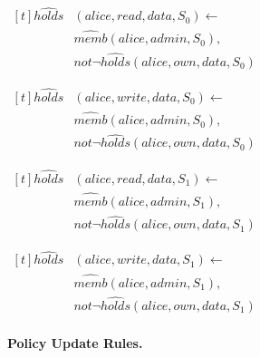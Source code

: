 \documentclass[global,twocolumn,final]{svjour}
\newenvironment{vquote}
  {\begin{list}{}{\leftmargin 1em}\item[]}
  {\end{list}}
\begin{document}
          \begin{vquote}
            \begin{math}
              \begin{aligned}[t]
                \hat{holds}&(alice, read, data, S_{0}) \leftarrow \\
                 & \hat{memb}(alice, admin, S_{0}), \\
                 & not \lnot \hat{holds}(alice, own, data, S_{0})
              \end{aligned}
            \end{math}

            \begin{math}
              \begin{aligned}[t]
                \hat{holds}&(alice, write, data, S_{0}) \leftarrow \\
                 & \hat{memb}(alice, admin, S_{0}), \\
                 & not \lnot \hat{holds}(alice, own, data, S_{0})
              \end{aligned}
            \end{math}

            \begin{math}
              \begin{aligned}[t]
                \hat{holds}&(alice, read, data, S_{1}) \leftarrow \\
                 & \hat{memb}(alice, admin, S_{1}), \\
                 & not \lnot \hat{holds}(alice, own, data, S_{1})
              \end{aligned}
            \end{math}

            \begin{math}
              \begin{aligned}[t]
                \hat{holds}&(alice, write, data, S_{1}) \leftarrow \\
                 & \hat{memb}(alice, admin, S_{1}), \\
                 & not \lnot \hat{holds}(alice, own, data, S_{1})
              \end{aligned}
            \end{math}
          \end{vquote}

        \paragraph{Policy Update Rules.}
\end{document}
